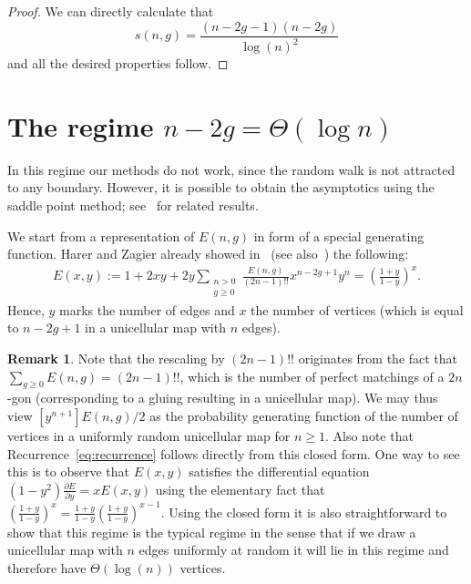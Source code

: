 \documentclass[a4paper,12pt]{article}
\theoremstyle{definition}
\newtheorem{remark}[theorem]{Remark}
\begin{document}
\begin{proof}
    We can directly calculate that 
\[s(n,g)=\frac{(n-2g-1)(n-2g)}{\log(n)^2}\]
and all the desired properties follow.
\end{proof}



\section{The regime $n-2g=\Theta(\log n)$}\label{sec:midv}

In this regime our methods do not work, since the random walk is not attracted to any  boundary.
However, it is possible to obtain the asymptotics using the saddle point method; see~\cite{Gao_log,logn-vertices} for related results.

We start from a representation of $E(n,g)$ in form of a special generating function. 
Harer and Zagier already showed in~\cite{HarerZagier1986Euler} (see also~\cite[Theorem~3.1.5]{LandoZvonkine}) the following:
\begin{align*}
    E(x,y) := 1 + 2xy + 2y \sum_{\substack{n > 0 \\ g\geq 0}} \frac{E(n,g)}{(2n-1)!!} x^{n-2g+1}y^{n} 
    = \left(\frac{1+y}{1-y}\right)^x.
\end{align*}
Hence, $y$ marks the number of edges and $x$ the number of vertices (which is equal to $n-2g+1$ in a unicellular map with $n$ edges).

\begin{remark}
Note that the rescaling by $(2n-1)!!$ originates from the fact that $\sum_{g \geq 0} E(n,g) = (2n-1)!!$, which is the number of perfect matchings of a $2n$-gon (corresponding to a gluing resulting in a unicellular map).
We may thus view $[y^{n+1}]E(n, g)/2$ as the probability generating function of the number of vertices in a uniformly random unicellular map for $n \geq 1$.  
Also note that Recurrence~\eqref{eq:recurrence} follows directly from this closed form. One way to see this is to observe that $E(x,y)$ satisfies the differential equation $(1-y^2)\frac{\partial E}{\partial y} = x E(x,y)$ using the elementary fact that $\left(\frac{1+y}{1-y}\right)^x = \frac{1+y}{1-y}\left(\frac{1+y}{1-y}\right)^{x-1}$.
Using the closed form it is also straightforward to show that this regime is the typical regime in the sense that if we draw a unicellular map with $n$ edges uniformly at random it will lie in this regime and therefore have $\Theta(\log(n))$ vertices.
\end{remark}
\end{document}
